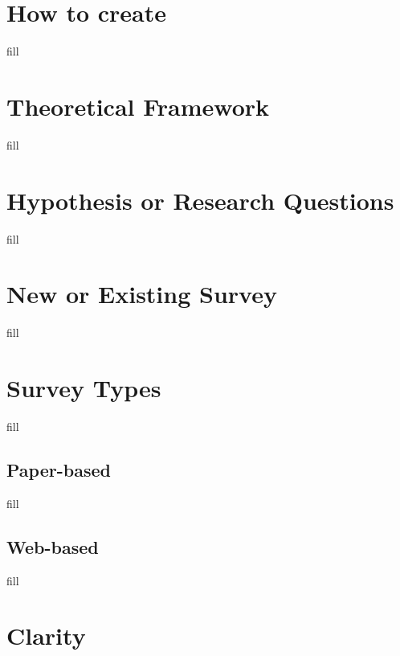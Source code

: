 \documentclass[
  b5paper]{book}
\begin{document}
\hypertarget{how-to-create}{%
\section{How to create}\label{how-to-create}}

fill

\hypertarget{theoretical-framework}{%
\section{Theoretical Framework}\label{theoretical-framework}}

fill

\hypertarget{hypothesis-or-research-questions}{%
\section{Hypothesis or Research Questions}\label{hypothesis-or-research-questions}}

fill

\hypertarget{new-or-existing-survey}{%
\section{New or Existing Survey}\label{new-or-existing-survey}}

fill

\hypertarget{survey-types}{%
\section{Survey Types}\label{survey-types}}

fill

\hypertarget{paper-based}{%
\subsection*{Paper-based}\label{paper-based}}

fill

\hypertarget{web-based}{%
\subsection*{Web-based}\label{web-based}}

fill

\hypertarget{clarity}{%
\section{Clarity}\label{clarity}}
\end{document}
